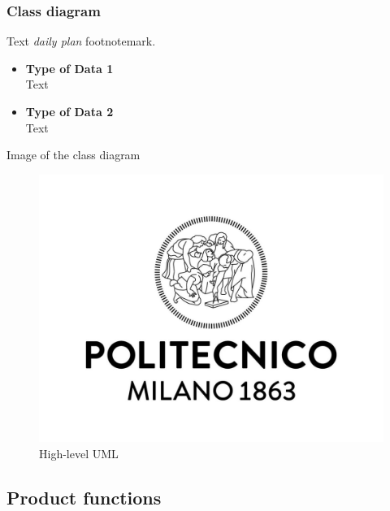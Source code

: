 \documentclass[table, 12pt]{article} %
\begin{document}
        \subsubsection{Class diagram}
        \label{class_diagram}
            Text \textit{daily plan}
            footnotemark\footnotemark.

            \begin{itemize}
                \item \textbf{Type of Data 1}\\
                Text
                \item \textbf{Type of Data 2}\\
                Text
            \end{itemize}
            
            Image of the class diagram
            \begin{center}
                \begin{figure}[H]
                    \includegraphics[scale=0.45, center]{assets/logo_polimi.jpg}
                    \caption{High-level UML}
                    \label{fig: UML}
                \end{figure}
            \end{center}

            
    \subsection{Product functions}
    \label{product_functions}
    
\end{document}
